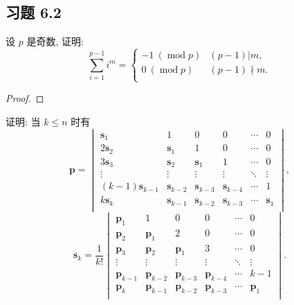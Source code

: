 \documentclass[UTF8]{ctexart}
\begin{document}
\subsection{习题 6.2}
\begin{exercise}%
    设 $p$ 是奇数, 证明:
    \[\sum\limits_{i=1}^{p-1}i^m=\begin{cases}
        -1\ (\operatorname{mod}p) & (p-1)|m, \\
        0\ (\operatorname{mod}p) & (p-1)\nmid m. \\
    \end{cases}\]
\end{exercise}
\begin{proof}
\end{proof}
\begin{exercise}%
    证明: 当 $k\leq n$ 时有
    \[\mathbf{p}=\begin{vmatrix}
        \mathbf{s}_1 & 1 & 0 & 0 & \cdots & 0 \\
        2\mathbf{s}_2 & \mathbf{s}_1 & 1 & 0 & \cdots & 0 \\
        3\mathbf{s}_3 & \mathbf{s}_2 & \mathbf{s}_1 & 1 & \cdots & 0 \\
        \vdots & \vdots & \vdots & \vdots & \ddots & \vdots \\
        (k-1)\mathbf{s}_{k-1} & \mathbf{s}_{k-2} & \mathbf{s}_{k-3} & \mathbf{s}_{k-4} & \cdots & 1 \\
        k\mathbf{s}_k & \mathbf{s}_{k-1} & \mathbf{s}_{k-2} & \mathbf{s}_{k-3} & \cdots & \mathbf{s}_1 \\
    \end{vmatrix},\]
    \[\mathbf{s}_k=\dfrac{1}{k!}\begin{vmatrix}
        \mathbf{p}_1 & 1 & 0 & 0 & \cdots & 0 \\
        \mathbf{p}_2 & \mathbf{p}_1 & 2 & 0 & \cdots & 0 \\
        \mathbf{p}_3 & \mathbf{p}_2 & \mathbf{p}_1 & 3 & \cdots & 0 \\
        \vdots & \vdots & \vdots & \vdots & \ddots & \vdots \\
        \mathbf{p}_{k-1} & \mathbf{p}_{k-2} & \mathbf{p}_{k-3} & \mathbf{p}_{k-4} & \cdots & k-1 \\
        \mathbf{p}_k & \mathbf{p}_{k-1} & \mathbf{p}_{k-2} & \mathbf{p}_{k-3} & \cdots & \mathbf{p}_1 \\
    \end{vmatrix}.\]
\end{exercise}
\end{document}
